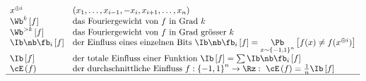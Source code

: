 \documentclass{article}
\begin{document}
\begin{math}
\begin{array}[\textwidth]{l l }
			x^{\oplus i} & (x_1, \dots , x_{i-1},-x_i,x_{i+1}, \dots ,x_n)\\
			\Wb^k\left[f\right] & \text{das Fouriergewicht von} \ f \ \text{in Grad} \ k\\
			\Wb^{>k} \left[f\right] & \text{das Fouriergewicht von} \ f \ \text{in Grad gr\"osser} \ k\\
			\Ib\nb\fb_i\left[f\right] & \text{der Einfluss eines einzelnen Bits} \ \Ib\nb\fb_i\left[f\right]= \underset{x \sim \left\lbrace -1,1 \right\rbrace^n}{\Pb } \left[f(x) \neq f(x^{\oplus i})\right] \\
			\Ib \left[f\right] & \text{der totale Einfluss einer Funktion} \ \Ib \left[f\right] = \sum \Ib\nb\fb_i\left[ f \right] \\
			\cE\left(f \right) & \text{der durchschnittliche Einfluss} \ f:\left\lbrace -1, 1 \right\rbrace^n \to \Rz : \ \cE\left(f\right) = \frac{1}{n} \Ib\left[f\right]\\
			\hline
		\end{array}
	\end{math}
	
	
\end{document}
